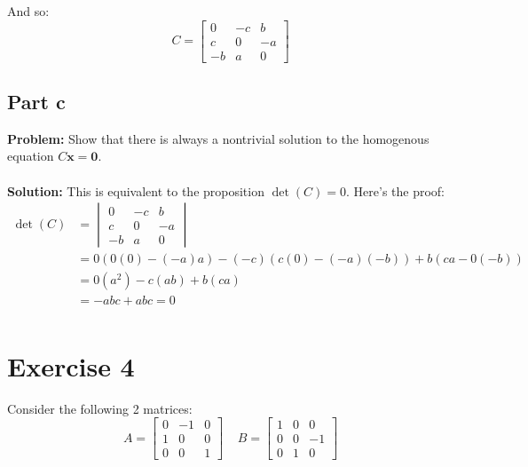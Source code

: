 \documentclass{article}
\begin{document}
And so:
$$C=\begin{bmatrix}
    0 & -c & b \\
    c & 0 & -a \\
    -b & a & 0
\end{bmatrix}$$

\subsection*{Part c}
\textbf{Problem:} Show that there is always a nontrivial solution to the homogenous equation $C\mathbf x=\mathbf 0$.
\\\\
\textbf{Solution:} This is equivalent to the proposition $\operatorname{det}(C)=0$. Here's the proof:
$$\begin{align*}
\operatorname{det}(C)&=
\begin{vmatrix}
  0 & -c & b \\
  c & 0 & -a \\
  -b & a & 0
\end{vmatrix}\\
&=0(0(0)-(-a)a)-(-c)(c(0)-(-a)(-b))+b(ca-0(-b))\\
&=0(a^2)-c(ab)+b(ca)\\
&=-abc+abc=0\\
\end{align*}$$
\section*{Exercise 4}
Consider the following 2 matrices:
$$A=\begin{bmatrix}
    0 & -1 & 0 \\
    1 & 0 & 0 \\
    0 & 0 & 1
\end{bmatrix}\ \ \ \ \
B=\begin{bmatrix}
    1 & 0 & 0 \\
    0 & 0 & -1 \\
    0 & 1 & 0
\end{bmatrix}$$
\end{document}
